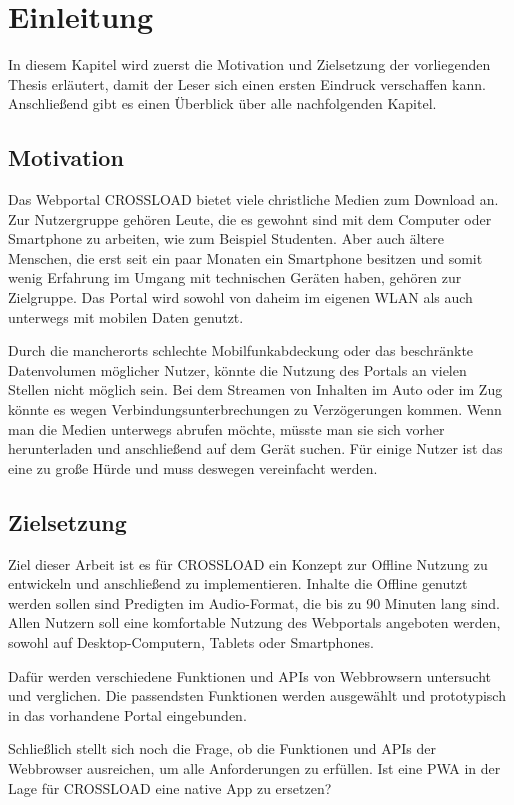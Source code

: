 \chapter{Einleitung}
\label{Kap1}

In diesem Kapitel wird zuerst die Motivation und Zielsetzung der vorliegenden Thesis erläutert, damit der Leser sich einen ersten Eindruck verschaffen kann. Anschließend gibt es einen Überblick über alle nachfolgenden Kapitel.


\section{Motivation}
Das Webportal CROSSLOAD bietet viele christliche Medien zum Download an. Zur Nutzergruppe gehören Leute, die es gewohnt sind mit dem Computer oder Smartphone zu arbeiten, wie zum Beispiel Studenten. Aber auch ältere Menschen, die erst seit ein paar Monaten ein Smartphone besitzen und somit wenig Erfahrung im Umgang mit technischen Geräten haben, gehören zur Zielgruppe. Das Portal wird sowohl von daheim im eigenen WLAN als auch unterwegs mit mobilen Daten genutzt.

Durch die mancherorts schlechte Mobilfunkabdeckung oder das beschränkte Datenvolumen möglicher Nutzer, könnte die Nutzung des Portals an vielen Stellen nicht möglich sein. Bei dem Streamen von Inhalten im Auto oder im Zug könnte es wegen Verbindungsunterbrechungen zu Verzögerungen kommen. Wenn man die Medien unterwegs abrufen möchte, müsste man sie sich vorher herunterladen und anschließend auf dem Gerät suchen. Für einige Nutzer ist das eine zu große Hürde und muss deswegen vereinfacht werden. 

\section{Zielsetzung}
Ziel dieser Arbeit ist es für CROSSLOAD ein Konzept zur Offline Nutzung zu entwickeln und anschließend zu implementieren. Inhalte die Offline genutzt werden sollen sind Predigten im Audio-Format, die bis zu 90 Minuten lang sind. Allen Nutzern soll eine komfortable Nutzung des Webportals angeboten werden, sowohl auf Desktop-Computern, Tablets oder Smartphones. 

Dafür werden verschiedene Funktionen und \acp{API} von Webbrowsern untersucht und verglichen. Die passendsten Funktionen werden ausgewählt und prototypisch in das vorhandene Portal eingebunden.

Schließlich stellt sich noch die Frage, ob die Funktionen und APIs der Webbrowser ausreichen, um alle Anforderungen zu erfüllen. Ist eine \ac{PWA} in der Lage für CROSSLOAD eine native App zu ersetzen?

